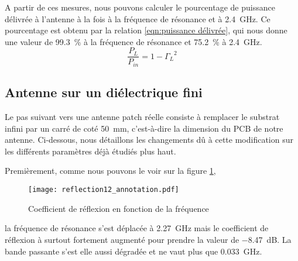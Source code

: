 A partir de ces mesures, nous pouvons calculer le pourcentage de puissance délivrée à l'antenne à la fois à la fréquence de résonance et à \SI{2.4}{\giga\hertz}. Ce pourcentage est obtenu par la relation \ref{eqn:puissance délivrée}, qui nous donne une valeur de \SI{99.3}{\percent} à la fréquence de résonance et \SI{75.2}{\percent} à \SI{2.4}{\giga\hertz}.
\begin{equation}
\frac{P_L}{P_{in}} = 1-{\Gamma_L}^2
\label{eqn:puissance délivrée}
\end{equation}


\subsection{Antenne sur un diélectrique fini}
Le pas suivant vers une antenne patch réelle consiste à remplacer le substrat infini par un carré de coté \SI{50}{\milli\meter}, c'est-à-dire la dimension du PCB de notre antenne. Ci-dessous, nous détaillons les changements dû à cette modification sur les différents paramètres déjà étudiés plus haut.

Premièrement, comme nous pouvons le voir sur la figure \ref{fig:reflection12_annotation},
\begin{figure}[htbp]
\centering
\texttt{[image: reflection12\_annotation.pdf]}
\caption{Coefficient de réflexion en fonction de la fréquence\label{fig:reflection12_annotation}}
\end{figure}
la fréquence de résonance s'est déplacée à \SI{2.27}{\giga\hertz} mais le coefficient de réflexion à surtout fortement augmenté pour prendre la valeur de \SI{-8.47}{\deci\bel}. La bande passante s'est elle aussi dégradée et ne vaut plus que \SI{0.033}{\giga\hertz}.

